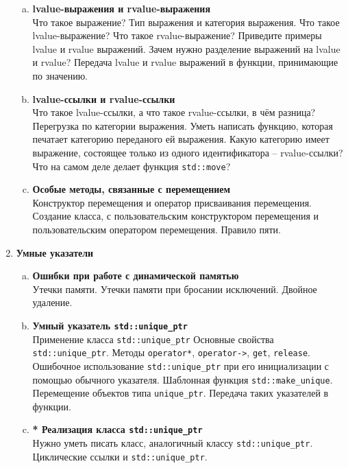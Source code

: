 \documentclass{article}
\begin{document}
\begin{enumerate}
\begin{enumerate}[a.]
\item \textbf{lvalue-выражения и rvalue-выражения}\\
Что такое выражение? Тип выражения и категория выражения. Что такое lvalue-выражение? Что такое rvalue-выражение? Приведите примеры lvalue и rvalue выражений. Зачем нужно разделение выражений на lvalue и rvalue? Передача lvalue и rvalue выражений в функции, принимающие по значению.

\item \textbf{lvalue-ссылки и rvalue-ссылки}\\
Что такое lvalue-ссылки, а что такое rvalue-ссылки, в чём разница?  Перегрузка по категории выражения. Уметь написать функцию, которая печатает категорию переданого ей выражения. Какую категорию имеет выражение, состоящее только из одного идентификатора -- rvalue-ссылки? Что на самом деле делает функция \texttt{std::move}?

\item \textbf{Особые методы, связанные с перемещением}\\
Конструктор перемещения и оператор присваивания перемещения. Создание класса, с пользовательским конструктором перемещения и пользовательским оператором перемещения. Правило пяти.

\end{enumerate}




\item \textbf{Умные указатели}
\begin{enumerate}[a.]

\item \textbf{Ошибки при работе с динамической памятью}\\
Утечки памяти. Утечки памяти при бросании исключений. Двойное удаление.

\item \textbf{Умный указатель \texttt{std::unique\_ptr}}\\
Применение класса \texttt{std::unique\_ptr} Основные свойства \texttt{std::unique\_ptr}. 
Методы \texttt{operator*}, \texttt{operator->}, \texttt{get}, \texttt{release}.
Ошибочное использование \texttt{std::unique\_ptr} при его инициализации с помощью обычного указателя. Шаблонная функция \texttt{std::make\_unique}. Перемещение объектов типа \texttt{unique\_ptr}. Передача таких указателей в функции.


\item \textbf{* Реализация класса \texttt{std::unique\_ptr}}\\
Нужно уметь писать класс, аналогичный классу \texttt{std::unique\_ptr}. Циклические ссылки и \texttt{std::unique\_ptr}.


\end{enumerate}
\end{enumerate}
\end{document}
